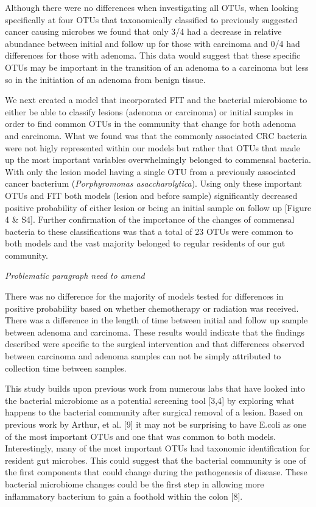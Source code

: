 \documentclass[12pt,]{article}
\begin{document}
Although there were no differences when investigating all OTUs, when
looking specifically at four OTUs that taxonomically classified to
previously suggested cancer causing microbes we found that only 3/4 had
a decrease in relative abundance between initial and follow up for those
with carcinoma and 0/4 had differences for those with adenoma. This data
would suggest that these specific OTUs may be important in the
transition of an adenoma to a carcinoma but less so in the initiation of
an adenoma from benign tissue.

We next created a model that incorporated FIT and the bacterial
microbiome to either be able to classify lesions (adenoma or carcinoma)
or initial samples in order to find common OTUs in the community that
change for both adenoma and carcinoma. What we found was that the
commonly associated CRC bacteria were not higly represented within our
models but rather that OTUs that made up the most important variables
overwhelmingly belonged to commensal bacteria. With only the lesion
model having a single OTU from a previously associated cancer bacterium
(\emph{Porphyromonas asaccharolytica}). Using only these important OTUs
and FIT both models (lesion and before sample) significantly decreased
positive probability of either lesion or being an initial sample on
follow up {[}Figure 4 \& S4{]}. Further confirmation of the importance
of the changes of commensal bacteria to these classifications was that a
total of 23 OTUs were common to both models and the vast majority
belonged to regular residents of our gut community.

\emph{Problematic paragraph need to amend}

There was no difference for the majority of models tested for
differences in positive probability based on whether chemotherapy or
radiation was received. There was a difference in the length of time
between initial and follow up sample between adenoma and carcinoma.
These results would indicate that the findings described were specific
to the surgical intervention and that differences observed between
carcinoma and adenoma samples can not be simply attributed to collection
time between samples.

This study builds upon previous work from numerous labs that have looked
into the bacterial microbiome as a potential screening tool {[}3,4{]} by
exploring what happens to the bacterial community after surgical removal
of a lesion. Based on previous work by Arthur, et al. {[}9{]} it may not
be surprising to have E.coli as one of the most important OTUs and one
that was common to both models. Interestingly, many of the most
important OTUs had taxonomic identification for resident gut microbes.
This could suggest that the bacterial community is one of the first
components that could change during the pathogenesis of disease. These
bacterial microbiome changes could be the first step in allowing more
inflammatory bacterium to gain a foothold within the colon {[}8{]}.
\end{document}
